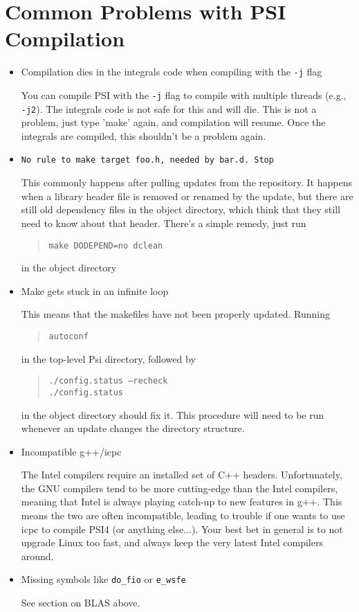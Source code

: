 \documentclass[12pt]{article}
\begin{document}
\section{Common Problems with PSI Compilation}
\begin{itemize}

\item Compilation dies in the integrals code when compiling with the {\tt -j} 
flag

You can compile PSI with the {\tt -j} flag to compile with multiple
threads (e.g., {\tt -j2}). The integrals code is not safe for this and
will die. This is not a problem, just type 'make' again, and compilation
will resume. Once the integrals are compiled, this shouldn't be a
problem again.

\item {\tt No rule to make target foo.h, needed by bar.d. Stop}

This commonly happens after pulling updates from the repository. It happens
when a library header file is removed or renamed by the update, but there are
still old dependency files in the object directory, which think that they
still need to know about that header. There's a simple remedy, just run
\begin{quotation}
\noindent
{\tt  make DODEPEND=no dclean} 
\end{quotation}
in the object directory

\item Make gets stuck in an infinite loop

This means that the makefiles have not been properly updated. Running
\begin{quotation}
\noindent 
{\tt autoconf}
\end{quotation}
in the top-level Psi directory, followed by
\begin{quotation}
\noindent
{\tt ./config.status --recheck} \\
{\tt ./config.status} 
\end{quotation}
in the object directory should fix it. This procedure will need to be run
whenever an update changes the directory structure.

\item Incompatible g++/icpc

The Intel compilers require an installed set of C++ headers. Unfortunately,
the GNU compilers tend to be more cutting-edge than the Intel compilers,
meaning that Intel is always playing catch-up to new features in g++. This
means the two are often incompatible, leading to trouble if one wants to use
icpc to compile PSI4 (or anything else...). Your best bet in general is to not
upgrade Linux too fast, and always keep the very latest Intel compilers
around.

\item Missing symbols like {\tt do\_fio} or {\tt e\_wsfe}

See section on BLAS above.

\end{itemize}
\end{document}
